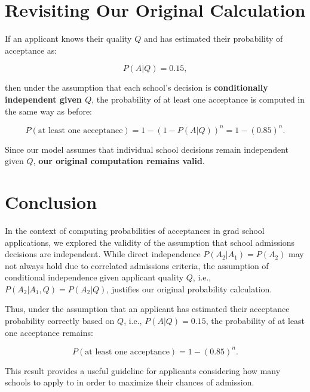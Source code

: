 \documentclass{article}
\begin{document}
\section{Revisiting Our Original Calculation}
If an applicant knows their quality \( Q \) and has estimated their probability of acceptance as:

\[
P(A | Q) = 0.15,
\]

then under the assumption that each school's decision is \textbf{conditionally independent given \( Q \)}, the probability of at least one acceptance is computed in the same way as before:

\[
P(\text{at least one acceptance}) = 1 - (1 - P(A | Q))^n = 1 - (0.85)^n.
\]

Since our model assumes that individual school decisions remain independent given \( Q \), \textbf{our original computation remains valid}.

\section{Conclusion}
In the context of computing probabilities of acceptances in grad school applications, we explored the validity of the assumption that school admissions decisions are independent. While direct independence \( P(A_2 | A_1) = P(A_2) \) may not always hold due to correlated admissions criteria, the assumption of conditional independence given applicant quality \( Q \), i.e., $ P(A_2 | A_1, Q) = P(A_2| Q) $, justifies our original probability calculation.

Thus, under the assumption that an applicant has estimated their acceptance probability correctly based on \( Q \), i.e., $P(A|Q)=0.15$, the probability of at least one acceptance remains:

\[
P(\text{at least one acceptance}) = 1 - (0.85)^n.
\]

This result provides a useful guideline for applicants considering how many schools to apply to in order to maximize their chances of admission.
\end{document}
